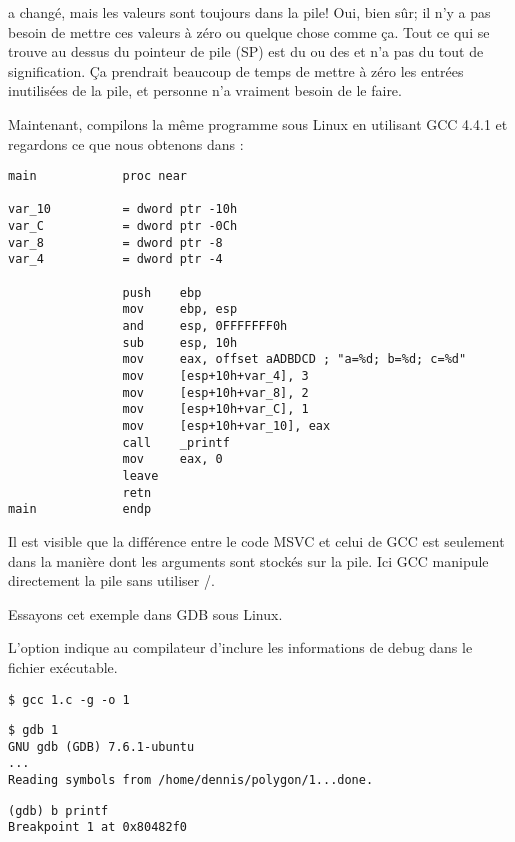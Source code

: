 \ESP a changé, mais les valeurs sont toujours dans la pile!
Oui, bien sûr; il n'y a pas besoin de mettre ces valeurs à zéro ou quelque chose
comme ça.
Tout ce qui se trouve au dessus du pointeur de pile (\ac{SP}) est du 
ou des  et n'a pas du tout de signification.
Ça prendrait beaucoup de temps de mettre à zéro les entrées inutilisées de la
pile, et personne n'a vraiment besoin de le faire.


Maintenant, compilons la même programme sous Linux en utilisant GCC 4.4.1 et regardons
ce que nous obtenons dans \IDA:

\begin{lstlisting}[style=customasmx86]
main            proc near

var_10          = dword ptr -10h
var_C           = dword ptr -0Ch
var_8           = dword ptr -8
var_4           = dword ptr -4

                push    ebp
                mov     ebp, esp
                and     esp, 0FFFFFFF0h
                sub     esp, 10h
                mov     eax, offset aADBDCD ; "a=%d; b=%d; c=%d"
                mov     [esp+10h+var_4], 3
                mov     [esp+10h+var_8], 2
                mov     [esp+10h+var_C], 1
                mov     [esp+10h+var_10], eax
                call    _printf
                mov     eax, 0
                leave
                retn
main            endp
\end{lstlisting}

Il est visible que la différence entre le code MSVC et celui de GCC est seulement
dans la manière dont les arguments sont stockés sur la pile.
Ici GCC manipule directement la pile sans utiliser \PUSH/\POP.


Essayons cet exemple dans \ac{GDB} sous Linux.

L'option  indique au compilateur d'inclure les informations de debug dans
le fichier exécutable.

\begin{lstlisting}
$ gcc 1.c -g -o 1
\end{lstlisting}

\begin{lstlisting}
$ gdb 1
GNU gdb (GDB) 7.6.1-ubuntu
...
Reading symbols from /home/dennis/polygon/1...done.
\end{lstlisting}

\begin{lstlisting}[caption=let's set breakpoint on \printf]
(gdb) b printf
Breakpoint 1 at 0x80482f0
\end{lstlisting}

